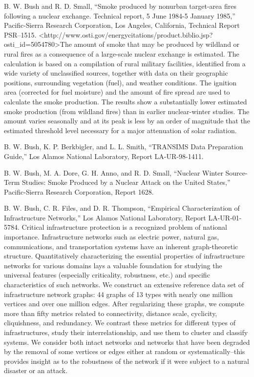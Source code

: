 \documentclass[]{article}
\begin{document}
B. W. Bush and R. D. Small, ``Smoke produced by nonurban target-area
fires following a nuclear exchange. Technical report, 5 June 1984-5
January 1985,'' Pacific-Sierra Research Corporation, Los Angeles,
California, Technical Report PSR--1515.
\textless{}http://www.osti.gov/energycitations/product.biblio.jsp?osti\_id=5054780\textgreater{}The
amount of smoke that may be produced by wildland or rural fires as a
consequence of a large-scale nuclear exchange is estimated. The
calculation is based on a compilation of rural military facilities,
identified from a wide variety of unclassified sources, together with
data on their geographic positions, surrounding vegetation (fuel), and
weather conditions. The ignition area (corrected for fuel moisture) and
the amount of fire spread are used to calculate the smoke production.
The results show a substantially lower estimated smoke production (from
wildland fires) than in earlier nuclear-winter studies. The amount
varies seasonally and at its peak is less by an order of magnitude that
the estimated threshold level necessary for a major attenuation of solar
radiation.

B. W. Bush, K. P. Berkbigler, and L. L. Smith, ``TRANSIMS Data
Preparation Guide,'' Los Alamos National Laboratory, Report
LA-UR-98-1411.

B. W. Bush, M. A. Dore, G. H. Anno, and R. D. Small, ``Nuclear Winter
Source-Term Studies: Smoke Produced by a Nuclear Attack on the United
States,'' Pacific-Sierra Research Corporation, Report 1628.

B. W. Bush, C. R. Files, and D. R. Thompson, ``Empirical
Characterization of Infrastructure Networks,'' Los Alamos National
Laboratory, Report LA-UR-01-5784. Critical infrastructure protection is
a recognized problem of national importance. Infrastructure networks
such as electric power, natural gas, communications, and transportation
systems have an inherent graph-theoretic structure. Quantitatively
characterizing the essential properties of infrastructure networks for
various domains lays a valuable foundation for studying the universal
features (especially criticality, robustness, etc.) and specific
characteristics of such networks. We construct an extensive reference
data set of infrastructure network graphs: 44 graphs of 13 types with
nearly one million vertices and over one million edges. After
regularizing these graphs, we compute more than fifty metrics related to
connectivity, distance scale, cyclicity, cliquishness, and redundancy.
We contrast these metrics for different types of infrastructures, study
their interrelationship, and use them to cluster and classify systems.
We consider both intact networks and networks that have been degraded by
the removal of some vertices or edges either at random or
systematically--this provides insight as to the robustness of the
network if it were subject to a natural disaster or an attack.
\end{document}
